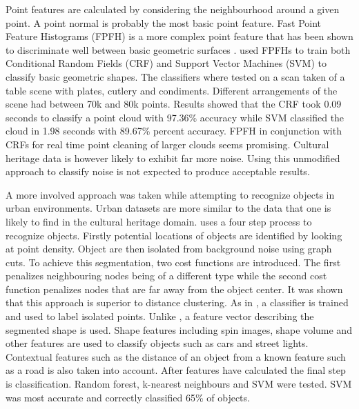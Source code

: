 \documentclass[10pt,twocolumn]{article}
\begin{document}
Point features are calculated by considering the neighbourhood around a given point. A point normal is probably the most basic point feature. Fast Point Feature Histograms (FPFH) is a more complex point feature that has been shown to discriminate well between basic geometric surfaces \cite{Rusu2009}. \citeauthor{Rusu2009} used FPFHs to train both Conditional Random Fields (CRF) and Support Vector Machines (SVM) to classify basic geometric shapes. The classifiers where tested on a scan taken of a table scene with plates, cutlery and condiments. Different arrangements of the scene had between 70k and 80k p\citeauthor{Golovinskiy2009}oints. Results showed that the CRF took 0.09 seconds to classify a point cloud with 97.36\% accuracy while SVM classified the cloud in 1.98 seconds with 89.67\% percent accuracy. FPFH in conjunction with CRFs for real time point cleaning of larger clouds seems promising. Cultural heritage data is however likely to exhibit far more noise. Using this unmodified approach to classify noise is not expected to produce acceptable results.

A more involved approach was taken while attempting to recognize objects in urban environments. Urban datasets are more similar to the data that one is likely to find in the cultural heritage domain. \citeauthor{Golovinskiy2009} uses a four step process to recognize objects. Firstly potential locations of objects are identified by looking at point density. Object are then isolated from background noise using graph cuts. To achieve this segmentation, two cost functions are introduced. The first penalizes neighbouring nodes being of a different type while the second cost function penalizes nodes that are far away from the object center. It was shown that this approach is superior to distance clustering. As in \cite{Rusu2009}, a classifier is trained and used to label isolated points. Unlike \cite{Rusu2009}, a feature vector describing the segmented shape is used. Shape features including spin images, shape volume and other features are used to classify objects such as cars and street lights. Contextual features such as the distance of an object from a known feature such as a road is also taken into account. After features have calculated the final step is classification. Random forest, k-nearest neighbours and SVM were tested. SVM was most accurate and correctly classified 65\% of objects.

\end{document}
